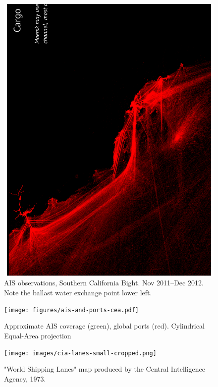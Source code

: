\begin{figure}[htbp]
  \centering
  \includegraphics[width=140mm,angle=-90]{figures/cal-cargo.pdf}
  \caption{AIS observations, Southern California Bight. Nov 2011--Dec 2012. Note the ballast water exchange point lower left.}
  \label{fig:cal-cargo}
\end{figure}


\begin{figure}[htbp]
  \centering
  \texttt{[image: figures/ais-and-ports-cea.pdf]}
  \caption{Approximate AIS coverage (green), global ports (red). Cylindrical Equal-Area projection}
  \label{fig:ais-coverage}
\end{figure}

\begin{figure}[htbp]
  \centering
  \texttt{[image: images/cia-lanes-small-cropped.png]}
  \caption{"World Shipping Lanes" map produced by the Central Intelligence Agency, 1973.}
  \label{fig:cia-shipping-map}
\end{figure}


